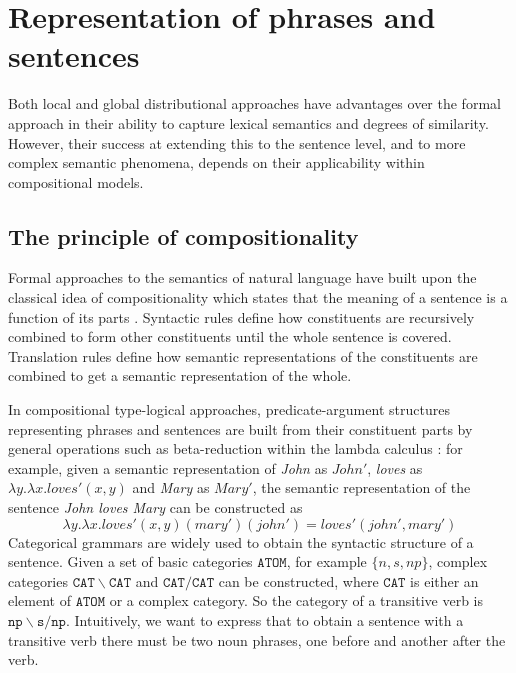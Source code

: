 \section{Representation of phrases and sentences}
\label{sec:similarity-compounds}

Both local and global distributional approaches have advantages over the formal approach in their ability to capture lexical semantics and degrees of similarity. However, their success at extending this to the sentence level, and to more complex semantic phenomena, depends on their applicability within compositional models.

\subsection{The principle of compositionality}
\label{sec:formal-semantics}

Formal approaches to the semantics of natural language have built upon the classical idea of compositionality which states that the meaning of a sentence is a function of its parts \cite{Janssen2001}. Syntactic rules define how constituents are recursively combined to form other constituents until the whole sentence is covered. Translation rules define how semantic representations of the constituents are combined to get a semantic representation of the whole.

In compositional type-logical approaches, predicate-argument structures representing phrases and sentences are built from their constituent parts by general operations such as beta-reduction within the lambda calculus \cite{THEO:THEO373}: for example, given a semantic representation of \emph{John}
as $\mathit{John}'$, \emph{loves} as $\lambda y.\lambda x.\mathit{loves}'(x, y)$ and \emph{Mary} as $\mathit{Mary'}$, the semantic representation of the sentence \emph{John loves Mary} can be constructed as
%
\begin{equation*}
\lambda y.\lambda
x.\mathit{loves}'(x, y)(\mathit{mary}')(\mathit{john}') =
\mathit{loves}'(\mathit{john}', \mathit{mary}')
\end{equation*}
%
Categorical grammars are widely used to obtain the syntactic structure of a sentence. Given a set of basic categories $\texttt{ATOM}$, for example $\{\mathit{n}, \mathit{s}, \mathit{np}\}$, complex categories $\mathtt{CAT} \backslash \mathtt{CAT}$ and $\mathtt{CAT}/\mathtt{CAT}$ can be constructed, where $\mathtt{CAT}$ is either an element of $\texttt{ATOM}$ or a complex category. So the category of a transitive verb is $\mathtt{np}\backslash\mathtt{s}/\mathtt{np}$. Intuitively, we want to express that to obtain a sentence with a transitive verb there must be two noun phrases, one before and another after the verb.

